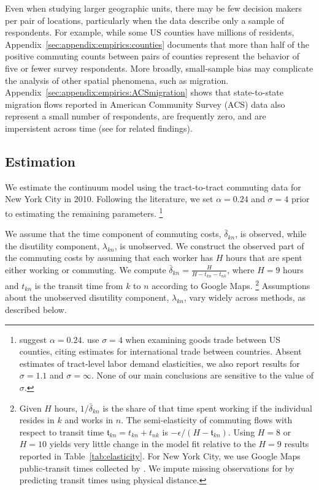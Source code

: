 \documentclass[11pt]{article}
\theoremstyle{definition}
\begin{document}
Even when studying larger geographic units,
there may be few decision makers per pair of locations,
particularly when the data describe only a sample of respondents.
For example, while some US counties have millions of residents,
Appendix~\ref{sec:appendix:empirics:counties} documents that
more than half of the positive commuting counts between pairs of counties
represent the behavior of five or fewer survey respondents.
More broadly,
small-sample bias may complicate the analysis of other spatial phenomena,
such as migration.
Appendix~\ref{sec:appendix:empirics:ACSmigration} shows that
state-to-state migration flows reported in American Community Survey (ACS) data
also represent a small number of respondents, are frequently zero, and are impersistent across time
(see \cite{FoschiHouseProebstingTesar:2023} for related findings).

\subsection{Estimation}\label{sec:ctflgranular:estimation}\label{sec:continuum:estimation}

We estimate the continuum model using the tract-to-tract commuting data for New York City in 2010.
Following the literature, we set $\alpha=0.24$ and $\sigma=4$ prior to estimating the remaining parameters.%
\footnote{%
	\cite{DavisOrtalo-Magne:2011} suggest $\alpha=0.24$.
	\cite{MonteReddingRossi-Hansberg:2018} use $\sigma = 4$ when examining goods trade between US counties,
	citing estimates for international trade between countries.
	Absent estimates of tract-level labor demand elasticities,
	we also report results for $\sigma = 1.1$ and $\sigma = \infty$.
	None of our main conclusions are sensitive to the value of $\sigma$.
}

We assume that
the time component of commuting costs, $\bar{\delta}_{kn}$, is observed,
while the disutility component, $\lambda_{kn}$, is unobserved.
We construct the observed part of the commuting costs by assuming that each worker has $H$ hours that are spent either working or commuting.
We compute $\bar{\delta}_{kn} = \frac{H}{H - t_{kn} - t_{nk}}$,
where $H=9$ hours and $t_{kn}$ is the transit time from $k$ to $n$ according to Google Maps.%
\footnote{%
Given $H$ hours, $1/\bar{\delta}_{kn}$ is the share of that time spent working if the individual resides in $k$ and works in $n$.
The semi-elasticity of commuting flows with respect to 
transit time $\mathfrak{t}_{kn} = t_{kn} + t_{nk}$
is $-\epsilon/\left(H - \mathfrak{t}_{kn}\right)$.
Using $H=8$ or $H=10$ yields very little change in the model fit relative to the $H=9$ results reported in Table~\ref{tab:elasticity}.
For New York City, we use Google Maps public-transit times collected by \cite{DavisDingelMonrasMorales:2019}.
We impute missing observations for 
by predicting transit times using physical distance.
}
Assumptions about the unobserved disutility component, $\lambda_{kn}$, vary widely across methods, as described below.
 
\end{document}
